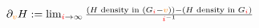 \documentclass[crop,equation,convert={outext=.svg,command=\unexpanded{pdf2svg \infile\space\outfile}},multi=false]{standalone}
\begin{document}
\color{white}
\Large
    $\partial_{\color{orange}v} H :=\lim_{{\color{red}i}\to\infty}\frac{(H \text{ density in
    }(G_{\color{red}i}-{\color{orange}v})) - (H \text{ density in }G_{\color{red}i})}{{\color{red}i}^{-1}}$
\end{document}
